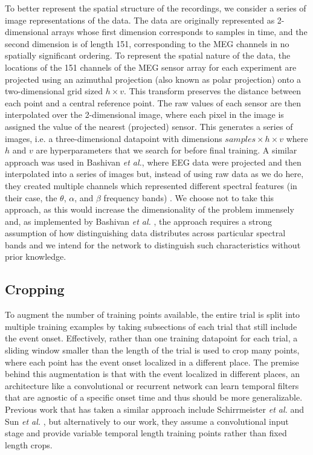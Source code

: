 \documentclass[fleqn,10pt]{wlscirep}
\begin{document}
To better represent the spatial structure of the recordings, we consider a series of image representations of the data. The data are originally represented as 2-dimensional arrays whose first dimension corresponds to samples in time, and the second dimension is of length 151, corresponding to the MEG channels in no spatially significant ordering. To represent the spatial nature of the data, the locations of the 151 channels of the MEG sensor array for each experiment are projected using an azimuthal projection (also known as polar projection) onto a two-dimensional grid sized $h \times v$. This transform preserves the distance between each point and a central reference point. The raw values of each sensor are then interpolated over the 2-dimensional image, where each pixel in the image is assigned the value of the nearest (projected) sensor. This generates a series of images, i.e. a three-dimensional datapoint with dimensions $samples \times  h \times v$ where $h$ and $v$ are hyperparameters that we search for before final training. A similar approach was used in Bashivan {\em et al.}, where EEG data were projected and then interpolated into a series of images but, instead of using raw data as we do here, they created multiple channels which represented different spectral features (in their case, the $\theta$, $\alpha$, and $\beta$ frequency bands) \cite{Bashivan2016}. We choose not to take this approach, as this would increase the dimensionality of the problem immensely and, as implemented by Bashivan {\em et al.} \cite{Bashivan2016}, the approach requires a strong assumption of how distinguishing data distributes across particular spectral bands and we intend for the network to distinguish such characteristics without prior knowledge.

\subsection*{Cropping}

To augment the number of training points available, the entire trial is split into multiple training examples by taking subsections of each trial that still include the event onset. Effectively, rather than one training datapoint for each trial, a sliding window smaller than the length of the trial is used to crop many points, where each point has the event onset localized in a different place. The premise behind this augmentation is that with the event localized in different places, an architecture like a convolutional or recurrent network can learn temporal filters that are agnostic of a specific onset time and thus should be more generalizable. Previous work that has taken a similar approach include Schirrmeister {\em et al.} \cite{Schirrmeister2017} and Sun {\em et al.} \cite{Sun}, but alternatively to our work, they assume a convolutional input stage and provide variable temporal length training points rather than fixed length crops. %
\end{document}
